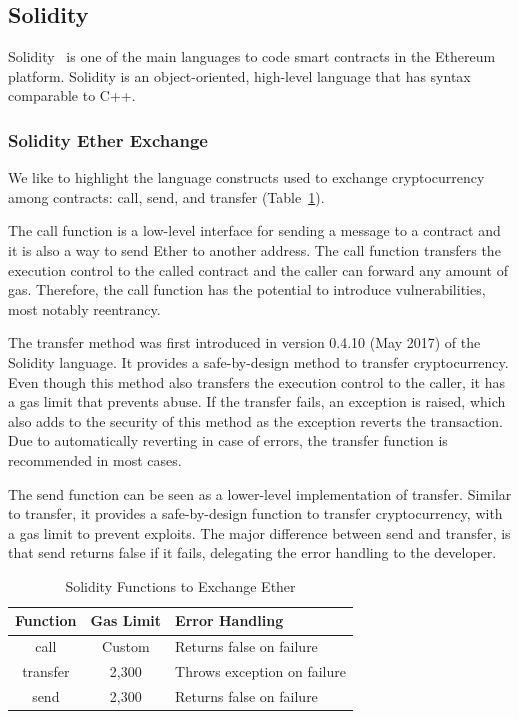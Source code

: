 \documentclass[10pt,conference]{IEEEtran}
\begin{document}

\subsection{Solidity}

Solidity~\cite{solidity} is one of the main languages to code smart contracts in the Ethereum platform. Solidity is an object-oriented, high-level language that has syntax comparable to C++.

\subsubsection{Solidity Ether Exchange}

We like to highlight the language constructs used to exchange cryptocurrency among contracts: call, send, and transfer (Table~\ref{tab:freq}).

The call function is a low-level interface for sending a message to a contract and it is also a way to send Ether to another address. The call function transfers the execution control to the called contract and the caller can forward any amount of gas. Therefore, the call function has the potential to introduce vulnerabilities, most notably reentrancy.

The transfer method was first introduced in version 0.4.10 (May 2017) of the Solidity language. It provides a safe-by-design method to transfer cryptocurrency. Even though this method also transfers the execution control to the caller, it has a gas limit that prevents abuse. If the transfer fails, an exception is raised, which also adds to the security of this method as the exception reverts the transaction. Due to automatically reverting in case of errors, the transfer function is recommended in most cases.

The send function can be seen as a lower-level implementation of transfer. Similar to transfer, it provides a safe-by-design function to transfer cryptocurrency, with a gas limit to prevent exploits. The major difference between send and transfer, is that send returns false if it fails, delegating the error handling to the developer.


\begin{table}
\center
  \caption{Solidity Functions to Exchange Ether}
  \label{tab:freq}
  \begin{tabular}{ccl}
    \hline
    Function & Gas Limit & Error Handling\\
    \hline
    call & Custom & Returns false on failure\\
    transfer & 2,300 & Throws exception on failure\\
    send & 2,300 & Returns false on failure\\
  \hline
\end{tabular}
\end{table}
\end{document}
